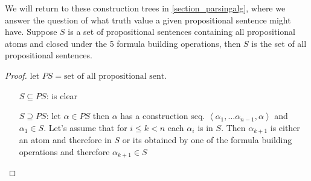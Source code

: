 We will return to these construction trees in \ref{section_parsingalg}, where we answer the question of what 
truth value a given propositional sentence might have.
\newpage
{}
\noindent{} Suppose $S$ is a set of propositional sentences
containing all propositional atoms and closed under the 5 formula building operations, 
then $S$ is the set of all propositional sentences.
\begin{proof}
    let $PS = \text{set of all propositional sent.}$
    \begin{itemize}[leftmargin=2cm]
        \item[$S\subseteq PS$:] is clear
        \item[$S\supseteq PS$:] let $\alpha\in PS$ then $\alpha$ has a construction seq. $\left\langle \alpha_1,\dots \alpha_{n-1},\alpha\right\rangle$ and $\alpha_1\in S$.
        Let's assume that for $i\leq k<n$ each $\alpha_i$ is in $S$. Then $\alpha_{k+1}$ is either an atom and therefore in $S$ or its obtained by one of the formula building operations  
        and therefore $\alpha_{k+1}\in S$
    \end{itemize}
\end{proof}
